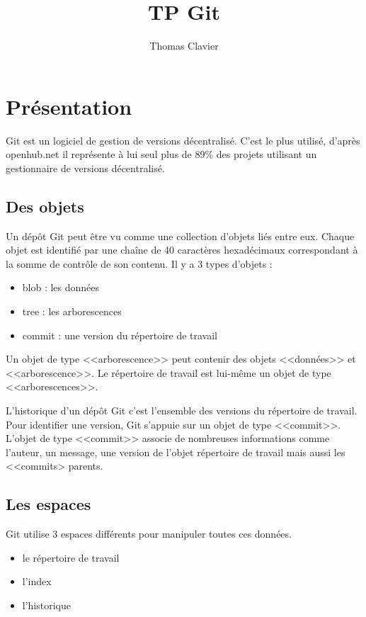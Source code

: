 \documentclass[a4paper]{article}
\title{TP Git}
\author{Thomas Clavier}
\date{}
\begin{document}
\maketitle

\section*{Présentation}

Git est un logiciel de gestion de versions décentralisé. C'est le plus utilisé, d'après openhub.net il représente à lui seul plus de 89\% des projets utilisant un gestionnaire de versions décentralisé.

\subsection*{Des objets}
Un dépôt Git peut être vu comme une collection d’objets liés entre eux. 
Chaque objet est identifié par une chaîne de 40 caractères hexadécimaux
correspondant à la somme de contrôle de son contenu. 
Il y a 3 types d'objets : 
\begin{itemize}
\item blob : les données
\item tree : les arborescences
\item commit : une version du répertoire de travail
\end{itemize}
Un objet de type <<arborescence>> peut contenir des objets <<données>> et <<arborescence>>.
Le répertoire de travail est lui-même un objet de type <<arborescences>>. 

L'historique d'un dépôt Git c'est l'ensemble des versions du répertoire de travail. Pour identifier une version, Git s'appuie sur un objet de type <<commit>>. 
L'objet de type <<commit>> associe de nombreuses informations comme l'auteur, un message, une version de l'objet répertoire de travail mais aussi les <<commits> parents.


\subsection*{Les espaces}
Git utilise 3 espaces différents pour manipuler toutes ces données.
\begin{itemize}
\item le répertoire de travail
\item l'index
\item l'historique
\end{itemize}
\end{document}
